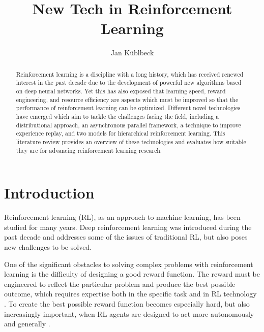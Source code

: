 \documentclass[runningheads]{llncs}
\begin{document}
%
\title{New Tech in Reinforcement Learning}
%
%
\author{Jan Küblbeck}
%
%
%
\maketitle              %
%
\begin{abstract}
Reinforcement learning is a discipline with a long history, which has received renewed interest in the past decade due to the development of powerful new algorithms based on deep neural networks.
Yet this has also exposed that learning speed, reward engineering, and resource efficiency are aspects which must be improved so that the performance of reinforcement learning can be optimized.
Different novel technologies have emerged which aim to tackle the challenges facing the field, including a distributional approach, an asynchronous parallel framework, a technique to improve experience replay, and two models for hierarchical reinforcement learning.
This literature review provides an overview of these technologies and evaluates how suitable they are for advancing reinforcement learning research.
\end{abstract}
%
%
%
\section{Introduction}

Reinforcement learning (RL), as an approach to machine learning, has been studied for many years. Deep reinforcement learning was introduced during the past decade and addresses some of the issues of traditional RL, but also poses new challenges to be solved.

One of the significant obstacles to solving complex problems with reinforcement learning is the difficulty of designing a good reward function. The reward must be engineered to reflect the particular problem and produce the best possible outcome, which requires expertise both in the specific task and in RL technology \cite{andrychowicz2017hindsight}. To create the best possible reward function becomes especially hard, but also increasingly important, when RL agents are designed to act more autonomously and generally \cite{dewey2014reinforcement}.
\end{document}

